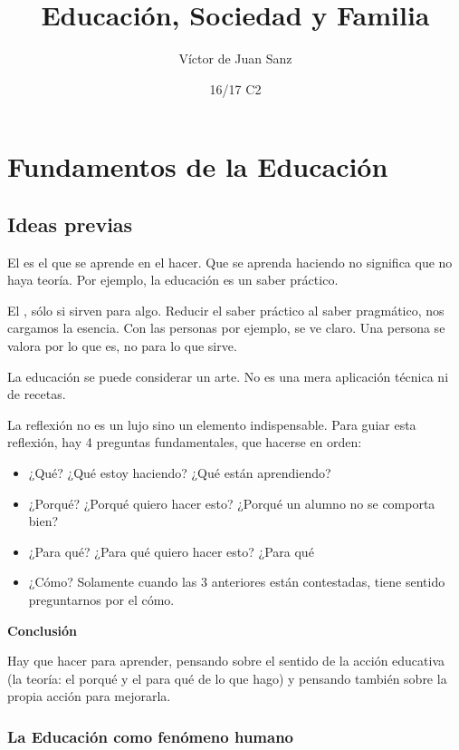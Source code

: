 \documentclass[palatino]{apuntesURJC}
\title{Educación, Sociedad y Familia}
\author{Víctor de Juan Sanz}
\date{16/17 C2}
\begin{document}
\pagestyle{plain}
\maketitle

\tableofcontents
\newpage


\chapter{Fundamentos de la Educación}

\section{Ideas previas}

El  es el que se aprende en el hacer.
%
Que se aprenda haciendo no significa que no haya teoría.
%
Por ejemplo, la educación es un saber práctico.


El , sólo si sirven para algo.
%
Reducir el saber práctico al saber pragmático, nos cargamos la esencia.
%
Con las personas por ejemplo, se ve claro.
%
Una persona se valora por lo que es, no para lo que sirve.


La educación se puede considerar un arte.
%
No es una mera aplicación técnica ni de recetas.

La reflexión no es un lujo sino un elemento indispensable.
%
Para guiar esta reflexión, hay 4 preguntas fundamentales, que hacerse en orden:
%
\begin{itemize}
	\item ¿Qué? ¿Qué estoy haciendo? ¿Qué están aprendiendo?
	\item ¿Porqué? ¿Porqué quiero hacer esto? ¿Porqué un alumno no se comporta bien?
	\item ¿Para qué? ¿Para qué quiero hacer esto? ¿Para qué
	\item ¿Cómo? \subitem Solamente cuando las 3 anteriores están contestadas, tiene sentido preguntarnos por el cómo.
\end{itemize}



\textbf{Conclusión}

Hay que hacer para aprender, pensando sobre el sentido de la acción educativa (la teoría: el porqué y el para qué de lo que hago) y pensando también sobre la propia acción para mejorarla.

\subsection{La Educación como fenómeno humano}
\end{document}
